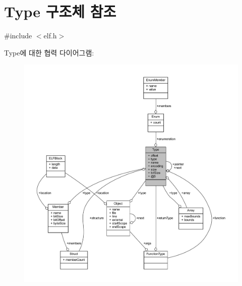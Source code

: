 \hypertarget{struct_type}{}\section{Type 구조체 참조}
\label{struct_type}


{\ttfamily \#include $<$elf.\+h$>$}



Type에 대한 협력 다이어그램\+:\nopagebreak
\begin{figure}[H]
\begin{center}
\leavevmode
\includegraphics[width=350pt]{struct_type__coll__graph}
\end{center}
\end{figure}
